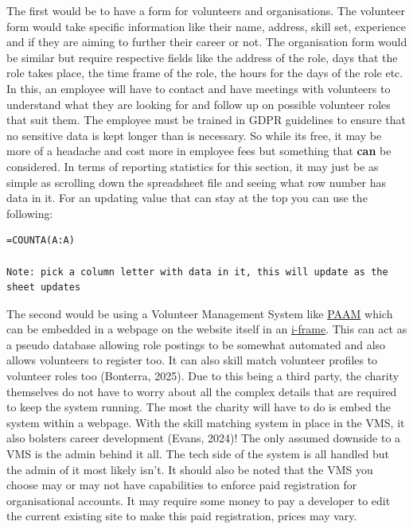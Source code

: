 \documentclass[11pt,a4paper]{article}
\begin{document}
\hfill \break
The first would be to have a form for volunteers and organisations. The volunteer form would take specific information like their name, address, skill set, experience and if they are aiming to further their career or not. The organisation form would be similar but require respective fields like the address of the role, days that the role takes place, the time frame of the role, the hours for the days of the role etc. In this, an employee will have to contact and have meetings with volunteers to understand what they are looking for and follow up on possible volunteer roles that suit them. The employee must be trained in GDPR guidelines to ensure that no sensitive data is kept longer than is necessary. So while its free, it may be more of a headache and cost more in employee fees but something that \textbf{can} be considered. In terms of reporting statistics for this section, it may just be as simple as scrolling down the spreadsheet file and seeing what row number has data in it. For an updating value that can stay at the top you can use the following: 
\hfill \break
\begin{lstlisting}
=COUNTA(A:A)

Note: pick a column letter with data in it, this will update as the sheet updates
\end{lstlisting}

\hfill \break
The second would be using a Volunteer Management System like \href{https://www.paamapp.com/}{PAAM} which can be embedded in a webpage on the website itself in an \href{https://en.wikipedia.org/wiki/HTML_element#Frames}{i-frame}. This can act as a pseudo database allowing role postings to be somewhat automated and also allows volunteers to register too. It can also skill match volunteer profiles to volunteer roles too (Bonterra, 2025). Due to this being a third party, the charity themselves do not have to worry about all the complex details that are required to keep the system running. The most the charity will have to do is embed the system within a webpage. With the skill matching system in place in the VMS, it also bolsters career development (Evans, 2024)! The only assumed downside to a VMS is the admin behind it all. The tech side of the system is all handled but the admin of it most likely isn't. It should also be noted that the VMS you choose may or may not have capabilities to enforce paid registration for organisational accounts. It may require some money to pay a developer to edit the current existing site to make this paid registration, prices may vary. 
\end{document}

